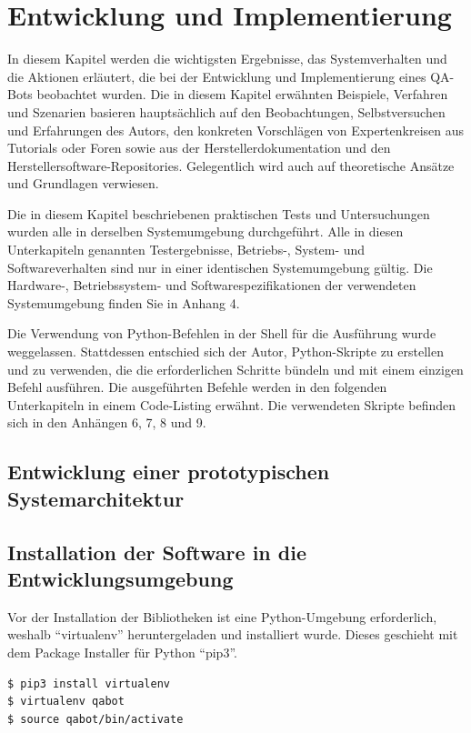 \documentclass[
        ngerman,
        paper=a4,
        numbers=noendperiod,
]{scrreprt}
\begin{document}
\chapter{Entwicklung und Implementierung}
In diesem Kapitel werden die wichtigsten Ergebnisse, das Systemverhalten und die Aktionen erläutert, die bei der Entwicklung und Implementierung eines QA-Bots beobachtet wurden. Die in diesem Kapitel erwähnten Beispiele, Verfahren und Szenarien basieren hauptsächlich auf den Beobachtungen, Selbstversuchen und Erfahrungen des Autors, den konkreten Vorschlägen von Expertenkreisen aus Tutorials oder Foren sowie aus der Herstellerdokumentation und den Herstellersoftware-Repositories. Gelegentlich wird auch auf theoretische Ansätze und Grundlagen verwiesen.

Die in diesem Kapitel beschriebenen praktischen Tests und Untersuchungen wurden alle in derselben Systemumgebung durchgeführt. Alle in diesen Unterkapiteln genannten Testergebnisse, Betriebs-, System- und Softwareverhalten sind nur in einer identischen Systemumgebung gültig. Die Hardware-, Betriebssystem- und Softwarespezifikationen der verwendeten Systemumgebung finden Sie in Anhang 4. %

Die Verwendung von Python-Befehlen in der Shell für die Ausführung wurde weggelassen. Stattdessen entschied sich der Autor, Python-Skripte zu erstellen und zu verwenden, die die erforderlichen Schritte bündeln und mit einem einzigen Befehl ausführen. Die ausgeführten Befehle werden in den folgenden Unterkapiteln in einem Code-Listing erwähnt. Die verwendeten Skripte befinden sich in den Anhängen 6, 7, 8 und 9. %


\section{Entwicklung einer prototypischen Systemarchitektur}


\section{Installation der Software in die Entwicklungsumgebung}
Vor der Installation der Bibliotheken ist eine Python-Umgebung erforderlich, weshalb \enquote{virtualenv} heruntergeladen und installiert wurde. Dieses geschieht mit dem Package Installer für Python \enquote{pip3}.

\begin{lstlisting}[language=bash, caption=Einrichten der virtuellen Umgebung]
$ pip3 install virtualenv
$ virtualenv qabot
$ source qabot/bin/activate
\end{lstlisting}
\end{document}
